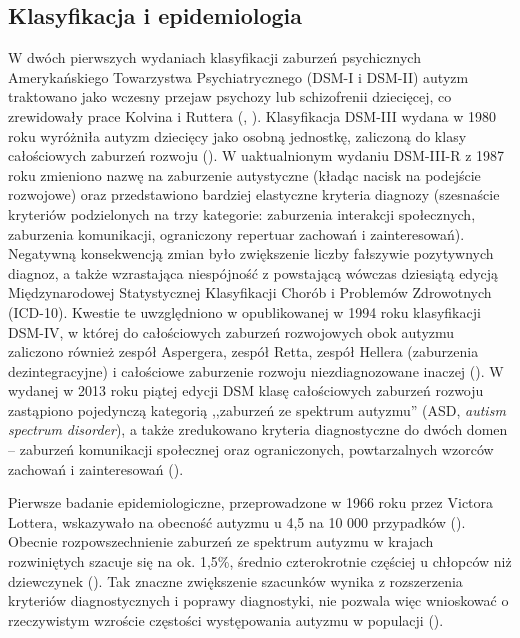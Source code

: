     \subsection{Klasyfikacja i epidemiologia}
    W dwóch pierwszych wydaniach klasyfikacji zaburzeń psychicznych Amerykańskiego Towarzystwa Psychiatrycznego (DSM-I i DSM-II) autyzm traktowano jako wczesny przejaw psychozy lub schizofrenii dziecięcej, co zrewidowały prace Kolvina i Ruttera (\cite{kolvin1972infantile}, \cite{rutter1972childhood}).
    Klasyfikacja DSM-III wydana w 1980 roku wyróżniła autyzm dziecięcy jako osobną jednostkę, zaliczoną do klasy całościowych zaburzeń rozwoju (\cite{volkmar2014kanner}).
    W uaktualnionym wydaniu DSM-III-R z 1987 roku zmieniono nazwę na zaburzenie autystyczne (kładąc nacisk na podejście rozwojowe) oraz przedstawiono bardziej elastyczne kryteria diagnozy (szesnaście kryteriów podzielonych na trzy kategorie: zaburzenia interakcji społecznych, zaburzenia komunikacji, ograniczony repertuar zachowań i zainteresowań).
    Negatywną konsekwencją zmian było zwiększenie liczby fałszywie pozytywnych diagnoz, a także wzrastająca niespójność z powstającą wówczas dziesiątą edycją Międzynarodowej Statystycznej Klasyfikacji Chorób i Problemów Zdrowotnych (ICD-10).
    Kwestie te uwzględniono w opublikowanej w 1994 roku klasyfikacji DSM-IV, w której do całościowych zaburzeń rozwojowych obok autyzmu zaliczono również zespół Aspergera, zespół Retta, zespół Hellera (zaburzenia dezintegracyjne) i całościowe zaburzenie rozwoju niezdiagnozowane inaczej (\cite{volkmar2014kanner}).
    W wydanej w 2013 roku piątej edycji DSM klasę całościowych zaburzeń rozwoju zastąpiono pojedynczą kategorią ,,zaburzeń ze spektrum autyzmu'' (ASD, \emph{autism spectrum disorder}), a także zredukowano kryteria diagnostyczne do dwóch domen -- zaburzeń komunikacji społecznej oraz ograniczonych, powtarzalnych wzorców zachowań i zainteresowań (\cite{maenner2014potential}).
    
    Pierwsze badanie epidemiologiczne, przeprowadzone w 1966 roku przez Victora Lottera, wskazywało na obecność autyzmu u 4,5 na 10 000 przypadków (\cite{lotter1966epidemiology}).
    Obecnie rozpowszechnienie zaburzeń ze spektrum autyzmu w krajach rozwiniętych szacuje się na ok. 1,5\%, średnio czterokrotnie częściej u chłopców niż dziewczynek (\cite{lyall2017changing}).
    Tak znaczne zwiększenie szacunków wynika z rozszerzenia kryteriów diagnostycznych i poprawy diagnostyki, nie pozwala więc wnioskować o rzeczywistym wzroście częstości występowania autyzmu w populacji (\cite{frith2008autyzm}).  
    
